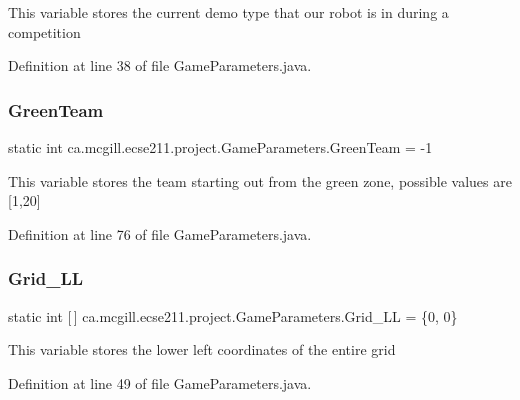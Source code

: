 This variable stores the current demo type that our robot is in during a competition 

Definition at line 38 of file Game\+Parameters.\+java.

\mbox{\label{enumca_1_1mcgill_1_1ecse211_1_1project_1_1_game_parameters_a1d6292807667d219edc172574c2aedbc}} 
\subsubsection{\texorpdfstring{Green\+Team}{GreenTeam}}
{\footnotesize\ttfamily  static  int ca.\+mcgill.\+ecse211.\+project.\+Game\+Parameters.\+Green\+Team = -\/1\hspace{0.3cm}{\ttfamily [static]}}

This variable stores the team starting out from the green zone, possible values are \mbox{[}1,20\mbox{]} 

Definition at line 76 of file Game\+Parameters.\+java.

\mbox{\label{enumca_1_1mcgill_1_1ecse211_1_1project_1_1_game_parameters_ab190471dbd9bb10d8cef92c1b8bea826}} 
\subsubsection{\texorpdfstring{Grid\+\_\+\+LL}{Grid\_LL}}
{\footnotesize\ttfamily  static  int \mbox{[}$\,$\mbox{]} ca.\+mcgill.\+ecse211.\+project.\+Game\+Parameters.\+Grid\+\_\+\+LL = \{0, 0\}\hspace{0.3cm}{\ttfamily [static]}}

This variable stores the lower left coordinates of the entire grid 

Definition at line 49 of file Game\+Parameters.\+java.

